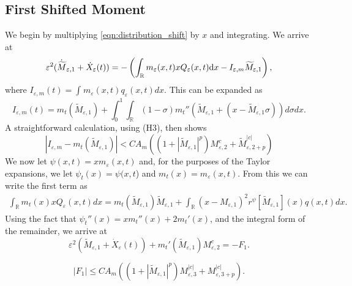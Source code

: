 \documentclass[]{article}
\theoremstyle{remark}
\begin{document}
\subsection{First Shifted Moment}  
We begin by multiplying \eqref{eqn:distribution_shift} by $x$ and integrating. We arrive at
\[
\varepsilon^2 (\dot{\widetilde{M}}_{\varepsilon,1}+\dot{X}_\varepsilon(t))= -   \left(  \int_{\mathbb R} m_\varepsilon(x,t)xQ_\varepsilon(x,t){\rm d}x  - I_{\varepsilon,m} \widetilde{M}_{\varepsilon,1} \right),
\]
    where $I_{\varepsilon,m}(t)=\int_{}m_\varepsilon(x,t)q_\varepsilon(x,t)dx$. This can be expanded as 
    \begin{equation}\label{eqn:Iem}
        I_{\varepsilon,m}(t)=m_t(\widetilde{M}_{\varepsilon,1})+\int_{0}^{1}\int_\mathbb{R}(1-\sigma)m_t''(\widetilde{M}_{\varepsilon,1}+(x-\widetilde{M}_{\varepsilon,1}\sigma))d\sigma{dx}.
    \end{equation}
    A straightforward calculation, using (H3), then shows
    \[|I_{\varepsilon,m}-m_{t}(\widetilde{M}_{\varepsilon,1})|<CA_m\left((1+|\widetilde{M}_{\varepsilon,1}|^p)M_{\varepsilon,2}^c+\widetilde{M}_{\varepsilon,2+p}^{|c|}\right)\]
We now let $\psi(x,t)=xm_\varepsilon(x,t)$ and, for the purposes of the Taylor expansions, we let $\psi_{t}(x)=\psi(x,t$) and $m_t(x)=m_\varepsilon(x,t)$. From this we can write the first term as 
\begin{align*}
\int_{\mathbb{R}}m_t(x)xQ_\varepsilon(x,t)dx=m_t(\widetilde{M}_{\varepsilon,1})\widetilde{M}_{\varepsilon,1}+\int_\mathbb{R}(x-M_{\varepsilon,1})^2r^\psi[\widetilde{M}_{\varepsilon,1}](x)q(x,t)dx.
\end{align*}
Using the fact that $\psi_t''(x)=xm_t''(x)+2m_t'(x)$, and the integral form of the remainder, we arrive at
    \[\varepsilon^2(\widetilde{M}_{\varepsilon,1}+\dot{X}_\varepsilon(t))+m_{t}'(\widetilde{M}_{\varepsilon,1})M_{\varepsilon,2}^c=-F_1.\]
 
    \begin{equation}\label{eqn:F1bound}
        |F_1|\leq{}CA_m\left((1+|\widetilde{M}_{\varepsilon,1}|^p){M}_{\varepsilon,3}^{|c|}+{M}_{\varepsilon,3+p}^{|c|}\right).
    \end{equation}
\end{document}

